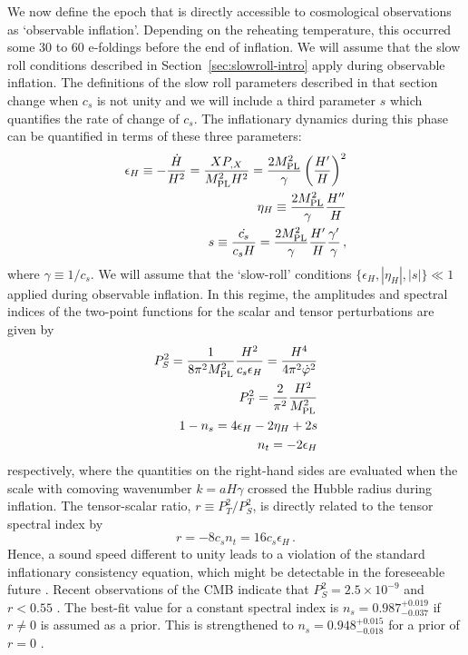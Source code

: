 We now define the epoch that is directly 
accessible to cosmological observations as `observable inflation'. 
Depending on the reheating 
temperature, this occurred some 30 to 60 e-foldings before the end of 
inflation. We will assume that the slow roll conditions described in 
Section~\ref{sec:slowroll-intro} apply during observable inflation.
The definitions of the slow roll parameters described in that section 
change when $c_s$ is not unity and we
will include a third parameter $s$ which quantifies the rate of change of $c_s$.
The inflationary dynamics during this phase can  
be quantified in terms of these three parameters: 
% 
\begin{eqnarray}
\label{eq:epsdefn-dbiintro}
\epsilon_H \equiv -\frac{\dot{H}}{H^2}
= \frac{XP_{,X}}{M_{\mathrm{PL}}^2H^2} 
= \frac{2M_{\mathrm{PL}}^2}{\gamma} \left( \frac{H'}{H} \right)^2 \\
\label{eq:defeta-dbiintro}
\eta_H \equiv  \frac{2M_{\mathrm{PL}}^2}{\gamma}\frac{H''}{H} \\
\label{eq:defs-dbiintro}
s \equiv \frac{\dot{c_s}}{c_sH} 
= \frac{2M_{\mathrm{PL}}^2}{\gamma} \frac{H'}{H}\frac{\gamma'}{\gamma}  \,,
\end{eqnarray}
% 
where $\gamma \equiv 1/c_s$. 
We will assume that the `slow-roll' conditions 
$\{ \epsilon_H, |\eta_H | , |s | \}  \ll 1$ applied during observable inflation. 
In this regime, the amplitudes and spectral indices of the two-point functions 
for the scalar and tensor perturbations are given by \cite{gm}
% 
\begin{eqnarray}
\label{eq:spectra-dbiintro}
P_S^2= \frac{1}{8 \pi^2 M_{\mathrm{PL}}^2} \frac{H^2}{c_s \epsilon_H}
= \frac{H^4}{4\pi^2\dot{\varphi}^2}
\\
P_T^2 = \frac{2}{\pi^2} \frac{H^2}{M_{\mathrm{PL}}^2} 
\\
\label{indices}
1-n_s = 4 \epsilon_H -2\eta_H  +2s 
\\
 n_t = -2\epsilon_H  
\end{eqnarray}
% 
respectively, where the quantities on the right-hand sides are evaluated 
when the scale with comoving wavenumber $k=aH\gamma$ crossed 
the Hubble radius during inflation.  
The tensor-scalar ratio, $r \equiv P_T^2/P_S^2$, is directly related to 
the tensor spectral index by \cite{gm}
% 
\begin{equation}
\label{eq:consistency-dbiintro}
r= -8c_sn_t = 16c_s \epsilon_H\,.
\end{equation}
%
Hence, a sound speed different to unity leads to a violation of the 
standard inflationary consistency equation, which might be 
detectable in the foreseeable future \cite{lidser1,lidser2}. 
Recent observations of the CMB 
indicate that $P^2_S=2.5 \times 10^{-9}$ and $r < 0.55$ \cite{spergel}. 
The best-fit value for a constant spectral index is 
$n_s = 0.987^{+0.019}_{-0.037}$ if $r\ne 0$ is assumed as a prior. 
This is strengthened to 
$n_s = 0.948^{+0.015}_{-0.018}$ for a prior of $r = 0$ \cite{spergel}. 


